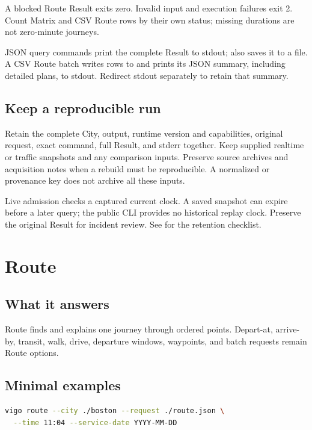 \documentclass[10pt,letterpaper]{article}
\begin{document}
A blocked Route Result exits zero. Invalid input and execution failures exit 2. Count Matrix and CSV Route rows by their own status; missing durations are not zero-minute journeys.

JSON query commands print the complete Result to stdout;  also saves it to a file. A CSV Route batch writes rows to  and prints its JSON summary, including detailed plans, to stdout. Redirect stdout separately to retain that summary.

\subsection{Keep a reproducible run}

Retain the complete City,  output, runtime version and capabilities, original request, exact command, full Result, and stderr together. Keep supplied realtime or traffic snapshots and any comparison inputs. Preserve source archives and acquisition notes when a rebuild must be reproducible. A normalized  or provenance key does not archive all these inputs.

Live admission checks a captured current clock. A saved snapshot can expire before a later query; the public CLI provides no historical replay clock. Preserve the original Result for incident review. See  for the retention checklist.

\section{Route}

\subsection{What it answers}

Route finds and explains one journey through ordered points. Depart-at, arrive-by, transit, walk, drive, departure windows, waypoints, and batch requests remain Route options.

\subsection{Minimal examples}

\begin{lstlisting}[language=bash]
vigo route --city ./boston --request ./route.json \
  --time 11:04 --service-date YYYY-MM-DD
\end{lstlisting}
\end{document}

